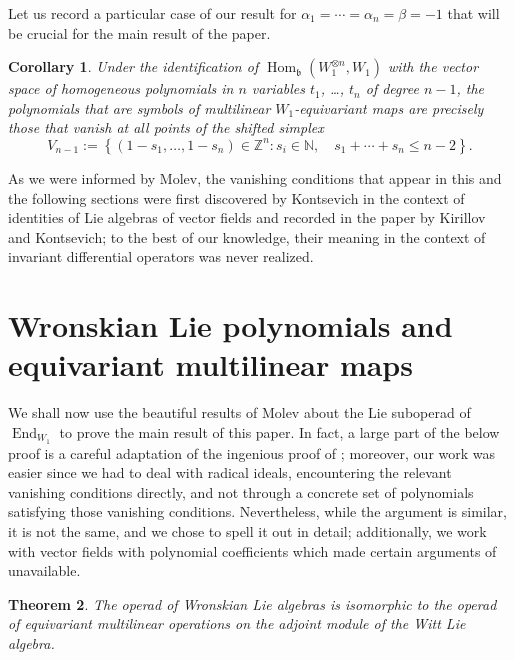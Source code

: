\documentclass[11pt,reqno]{amsart}
\theoremstyle{plain}
\newtheorem{theorem}{Theorem}[section]
\newtheorem{corollary}[theorem]{Corollary}
\theoremstyle{definition}
\theoremstyle{remark}
\DeclareMathOperator{\Hom}{Hom}
\DeclareMathOperator{\End}{End}
\begin{document}
Let us record a particular case of our result for $\alpha_1=\cdots=\alpha_n=\beta=-1$ that will be crucial for the main result of the paper.

\begin{corollary}\label{cor:inv-vanishing}
Under the identification of $\Hom_{\mathfrak{b}}(W_1^{\otimes n},W_1)$ with the vector space of homogeneous polynomials in $n$ variables $t_1$, \ldots, $t_n$ of degree $n-1$, the polynomials that are symbols of multilinear $W_1$-equivariant maps are precisely those that vanish at all points of the shifted simplex 
\begin{equation}\label{eq:simplex-ad}
V_{n-1}:=
\left\{
(1-s_1,\dots,1-s_n)\in\mathbb{Z}^n\colon 
s_i\in\mathbb{N},\quad s_1+\cdots+s_n\le n-2
\right\}.
\end{equation}
\end{corollary}

As we were informed by Molev, the vanishing conditions that appear in this and the following sections were first discovered by Kontsevich in the context of identities of Lie algebras of vector fields and recorded in the paper \cite{MR713969} by Kirillov and Kontsevich; to the best of our knowledge, their meaning in the context of invariant differential operators was never realized. 

\section{Wronskian Lie polynomials and equivariant multilinear maps}

We shall now use the beautiful results of Molev \cite{Mo} about the Lie suboperad of $\End_{W_1}$ to prove the main result of this paper. In fact, a large part of the below proof is a careful adaptation of the ingenious proof of \cite[Th.~1]{Mo}; moreover, our work was easier since we had to deal with radical ideals, encountering the relevant vanishing conditions directly, and not through a concrete set of polynomials satisfying those vanishing conditions. Nevertheless, while the argument is similar, it is not the same, and we chose to spell it out in detail; additionally, we work with vector fields with polynomial coefficients which made certain arguments of \cite{Mo} unavailable. 

\begin{theorem}\label{th:LieNovInv}
The operad of Wronskian Lie algebras is isomorphic to the operad of equivariant multilinear operations on the adjoint module of the Witt Lie algebra. 
\end{theorem}
\end{document}
